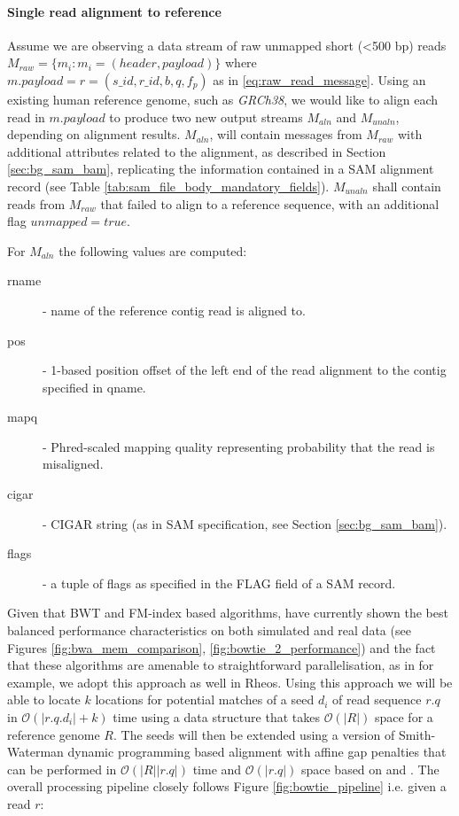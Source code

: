 \paragraph{Single read alignment to reference} 
Assume we are observing a data stream of raw unmapped short (<500 bp) reads $M_{raw} = \{m_i: m_i = (header, payload)\}$ where $m.payload = r = (s\_id, r\_id, b, q, f_p)$ as in \ref{eq:raw_read_message}. Using an existing human reference genome, such as \emph{GRCh38}, we would like to align each read in $m.payload$ to produce two new output streams $M_{aln}$ and $M_{unaln}$, depending on alignment results. $M_{aln}$, will contain messages from $M_{raw}$ with additional attributes related to the alignment, as described in Section \ref{sec:bg_sam_bam}, replicating the information contained in a SAM alignment record (see Table \ref{tab:sam_file_body_mandatory_fields}). $M_{unaln}$ shall contain reads from $M_{raw}$ that failed to align to a reference sequence, with an additional flag $unmapped=true$.

For $M_{aln}$ the following values are computed:

\begin{description}
    \item [rname] - name of the reference contig read is aligned to.
    \item [pos] - 1-based position offset of the left end of the read alignment to the contig specified in qname.
    \item [mapq] - Phred-scaled mapping quality representing probability that the read is misaligned.
    \item [cigar] - CIGAR string (as in SAM specification, see Section \ref{sec:bg_sam_bam}).
    \item [flags] - a tuple of flags as specified in the FLAG field of a SAM record.
\end{description}

Given that BWT and FM-index based algorithms\autocite{langmead2012fast},\autocite{Li2013} have currently shown the best balanced performance characteristics on both simulated and real data (see Figures \ref{fig:bwa_mem_comparison}, \ref{fig:bowtie_2_performance}) and the fact that these algorithms are amenable to straightforward parallelisation, as in \autocite{langmead2009searching} for example, we adopt this approach as well in Rheos. Using this approach we will be able to locate $k$ locations for potential matches of a seed $d_i$ of read sequence $r.q$ in $\mathcal{O}(|r.q.d_i| + k)$ time using a data structure that takes $\mathcal{O}(|R|)$ space for a reference genome $R$. The seeds will then be extended using a version of Smith-Waterman\autocite{smith1981comparison} dynamic programming based alignment with affine gap penalties that can be performed in $\mathcal{O}(|R||r.q|)$ time and $\mathcal{O}(|r.q|)$ space based on \autocite{myers1988optimal} and \autocite{farrar2006striped}. The overall processing pipeline closely follows Figure \ref{fig:bowtie_pipeline} i.e. given a read $r$: 

